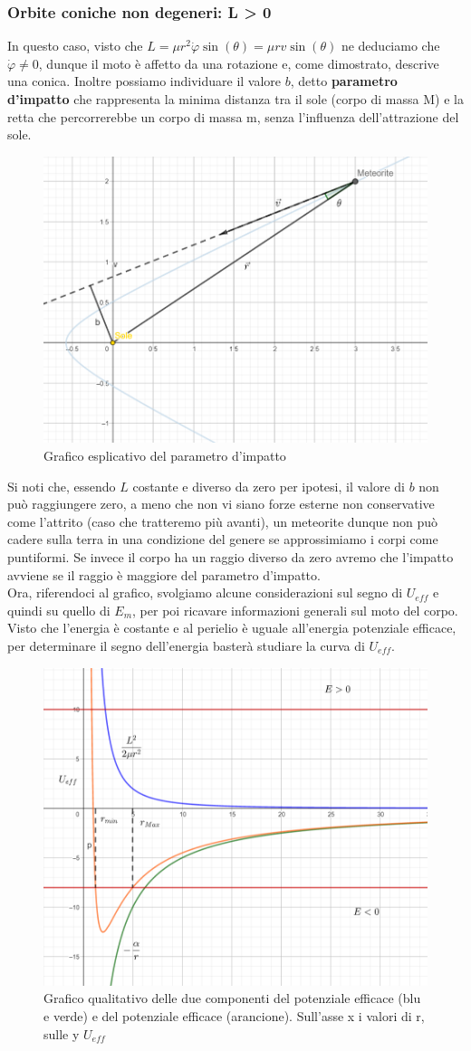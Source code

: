 \documentclass[10pt,a4paper]{article}
\begin{document}
\subsubsection*{Orbite coniche non degeneri: L > 0}
In questo caso, visto che $L = \mu r^2 \dot{\varphi} \sin(\theta) =  \mu r v \sin(\theta) $ ne deduciamo che $\dot{\varphi}\neq 0$, dunque il moto è affetto da una rotazione e, come dimostrato, descrive una conica. Inoltre possiamo individuare il valore $b$, detto \textbf{parametro d'impatto} che rappresenta la minima distanza tra il sole (corpo di massa M) e la retta che percorrerebbe un corpo di massa m, senza l'influenza dell'attrazione del sole.
\begin{figure}[h!]
	\centering
	\includegraphics[width=0.5\linewidth]{../images/meteorite}
	\caption{Grafico esplicativo del parametro d'impatto}
	\label{fig:meteorite}
\end{figure}
\FloatBarrier
Si noti che, essendo $L$ costante e diverso da zero per ipotesi, il valore di $b$ non può raggiungere zero, a meno che non vi siano forze esterne non conservative come l'attrito (caso che tratteremo più avanti), un meteorite dunque non può cadere sulla terra in una condizione del genere se approssimiamo i corpi come puntiformi. Se invece il corpo ha un raggio diverso da zero avremo che l'impatto avviene se il raggio è maggiore del parametro d'impatto.\\
Ora, riferendoci al grafico, svolgiamo alcune considerazioni sul segno di $U_{eff}$ e quindi su quello di $E_m$, per poi ricavare informazioni generali sul moto del corpo. Visto che l'energia è costante e al perielio è uguale all'energia potenziale efficace, per determinare il segno dell'energia basterà studiare la curva di $U_{eff}$.\\
\begin{figure}[h!]
	\centering
	\includegraphics[width=0.5\linewidth]{../images/potenziale_efficace}
	\caption{Grafico qualitativo delle due componenti del potenziale efficace (blu e verde) e del potenziale efficace (arancione). Sull'asse x i valori di r, sulle y $U_{eff}$}
	\label{fig:potenzialeefficace}
\end{figure}\FloatBarrier
\end{document}

